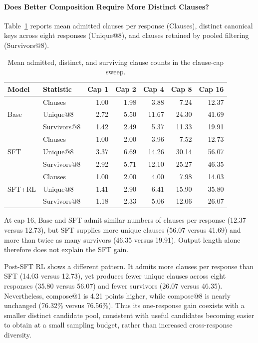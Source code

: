 \paragraph{Does Better Composition Require More Distinct Clauses?}
Table~\ref{tab:clause-cap-structure} reports mean admitted clauses per
response (Clauses), distinct canonical keys across eight responses
(Unique@8), and clauses retained by pooled filtering (Survivors@8).

\begin{table}[H]
\centering
\small
\caption{Mean admitted, distinct, and surviving clause counts in the clause-cap sweep.}
\label{tab:clause-cap-structure}
\begin{tabular}{llrrrrr}
\toprule
\rowcolor{algobg}
Model & Statistic & Cap 1 & Cap 2 & Cap 4 & Cap 8 & Cap 16 \\
\midrule
\multirow{3}{*}{Base}
 & Clauses & 1.00 & 1.98 & 3.88 & 7.24 & 12.37 \\
 & Unique@8 & 2.72 & 5.50 & 11.67 & 24.30 & 41.69 \\
 & Survivors@8 & 1.42 & 2.49 & 5.37 & 11.33 & 19.91 \\
\midrule
\multirow{3}{*}{SFT}
 & Clauses & 1.00 & 2.00 & 3.96 & 7.52 & 12.73 \\
 & Unique@8 & 3.37 & 6.69 & 14.26 & 30.14 & 56.07 \\
 & Survivors@8 & 2.92 & 5.71 & 12.10 & 25.27 & 46.35 \\
\midrule
\multirow{3}{*}{SFT+RL}
 & Clauses & 1.00 & 2.00 & 4.00 & 7.98 & 14.03 \\
 & Unique@8 & 1.41 & 2.90 & 6.41 & 15.90 & 35.80 \\
 & Survivors@8 & 1.18 & 2.33 & 5.06 & 12.06 & 26.07 \\
\bottomrule
\end{tabular}
\end{table}

At cap 16, Base and SFT admit similar numbers of clauses per response
(12.37 versus 12.73), but SFT supplies more unique clauses (56.07 versus
41.69) and more than twice as many survivors (46.35 versus 19.91).
Output length alone therefore does not explain the SFT gain.

Post-SFT RL shows a different pattern.  It admits more clauses per response
than SFT (14.03 versus 12.73), yet produces fewer unique clauses across
eight responses (35.80 versus 56.07) and fewer survivors (26.07 versus
46.35).  Nevertheless, compose@1 is 4.21 points higher, while compose@8
is nearly unchanged (76.32\% versus 76.56\%).  Thus its one-response gain
coexists with a smaller distinct candidate pool, consistent with useful
candidates becoming easier to obtain at a small sampling budget, rather
than increased cross-response diversity.

